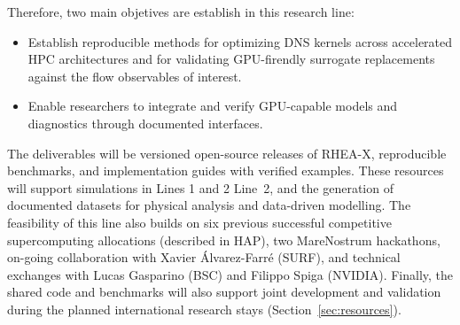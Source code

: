 \documentclass[11pt]{article}
\begin{document}
Therefore, two main objetives are establish in this research line:
\begin{itemize}
	\item[\textbf{O7.}] Establish reproducible methods for optimizing DNS kernels across accelerated HPC architectures and for validating GPU-firendly surrogate replacements against the flow observables of interest.
	\item[\textbf{O8.}] Enable researchers to integrate and verify GPU-capable models and diagnostics through documented interfaces.
\end{itemize}

The deliverables will be versioned open-source releases of RHEA-X, reproducible benchmarks, and implementation guides with verified examples. 
These resources will support simulations in Lines 1 and 2 Line~2, and the generation of documented datasets for physical analysis and data-driven modelling. 
The feasibility of this line also builds on six previous successful competitive supercomputing allocations (described in HAP), two MareNostrum hackathons, on-going collaboration with Xavier Álvarez-Farré (SURF), and technical exchanges with Lucas Gasparino (BSC) and Filippo Spiga (NVIDIA). 
Finally, the shared code and benchmarks will also support joint development and validation during the planned international research stays (Section~\ref{sec:resources}).
\end{document}
